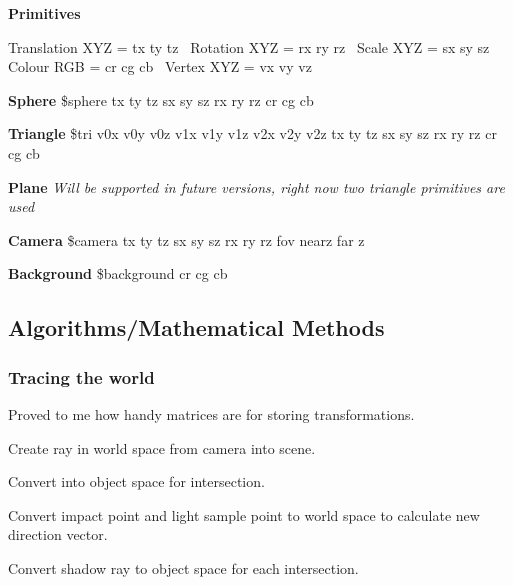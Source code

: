 \begin{DoxyItemize}
\item {\bfseries Primitives}

Translation X\+Y\+Z = {\ttfamily tx ty tz}~\newline
 Rotation X\+Y\+Z = {\ttfamily rx ry rz}~\newline
 Scale X\+Y\+Z = {\ttfamily sx sy sz}~\newline
 Colour R\+G\+B = {\ttfamily cr cg cb}~\newline
 Vertex X\+Y\+Z = {\ttfamily vx vy vz}~\newline

\begin{DoxyItemize}
\item {\bfseries Sphere} {\ttfamily \$sphere tx ty tz sx sy sz rx ry rz cr cg cb}
\item {\bfseries Triangle} {\ttfamily \$tri v0x v0y v0z v1x v1y v1z v2x v2y v2z tx ty tz sx sy sz rx ry rz cr cg cb}
\item {\bfseries Plane} {\itshape Will be supported in future versions, right now two triangle primitives are used}
\end{DoxyItemize}
\item {\bfseries Camera} {\ttfamily \$camera tx ty tz sx sy sz rx ry rz fov nearz far z}
\item {\bfseries Background} {\ttfamily \$background cr cg cb}
\end{DoxyItemize}

\subsection*{Algorithms/\+Mathematical Methods}

\subsubsection*{Tracing the world}

Proved to me how handy matrices are for storing transformations.


\begin{DoxyEnumerate}
\item Create ray in world space from camera into scene.
\item Convert into object space for intersection.
\item Convert impact point and light sample point to world space to calculate new direction vector.
\item Convert shadow ray to object space for each intersection.
\end{DoxyEnumerate}

